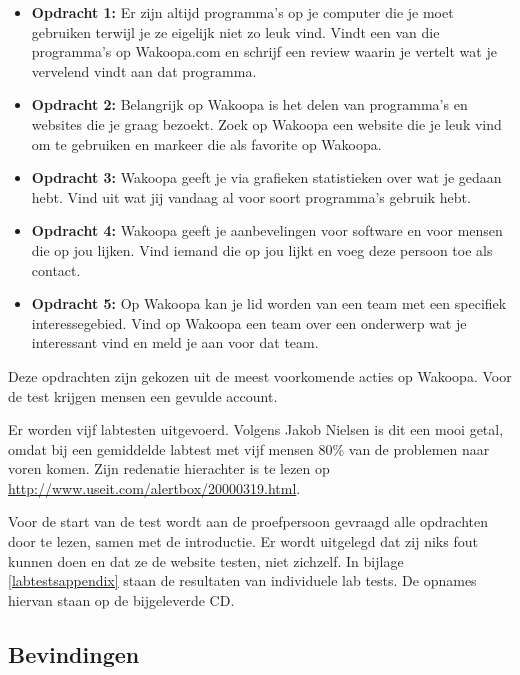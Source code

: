 \documentclass[a4paper, 10pt, pdftex]{report}
\begin{document}
    \begin{itemize}
      \item \textbf{Opdracht 1:}
      Er zijn altijd programma's op je computer die je moet gebruiken terwijl je ze eigelijk niet zo leuk vind. Vindt een van die programma's op Wakoopa.com en schrijf een review waarin je vertelt wat je vervelend vindt aan dat programma.

      \item \textbf{Opdracht 2:}
      Belangrijk op Wakoopa is het delen van programma's en websites die je graag bezoekt. Zoek op Wakoopa een website die je leuk vind om te gebruiken en markeer die als favorite op Wakoopa.

      \item \textbf{Opdracht 3:}
      Wakoopa geeft je via grafieken statistieken over wat je gedaan hebt. Vind uit wat jij vandaag al voor soort programma's gebruik hebt.

      \item \textbf{Opdracht 4:}
      Wakoopa geeft je aanbevelingen voor software en voor mensen die op jou lijken. Vind iemand die op jou lijkt en voeg deze persoon toe als contact.

      \item \textbf{Opdracht 5:}
      Op Wakoopa kan je lid worden van een team met een specifiek interessegebied. Vind op Wakoopa een team over een onderwerp wat je interessant vind en meld je aan voor dat team.
    \end{itemize}
    Deze opdrachten zijn gekozen uit de meest voorkomende acties op Wakoopa. Voor de test krijgen mensen een gevulde account.

    Er worden vijf labtesten uitgevoerd. Volgens Jakob Nielsen is dit een mooi getal, omdat bij een gemiddelde labtest met vijf mensen 80\% van de problemen naar voren komen. Zijn redenatie hierachter is te lezen op \url{http://www.useit.com/alertbox/20000319.html}.

    Voor de start van de test wordt aan de proefpersoon gevraagd alle opdrachten door te lezen, samen met de introductie. Er wordt uitgelegd dat zij niks fout kunnen doen en dat ze de website testen, niet zichzelf. In bijlage \ref{labtestsappendix} staan de resultaten van individuele lab tests. De opnames hiervan staan op de bijgeleverde CD.

    \subsection{Bevindingen}
\end{document}
